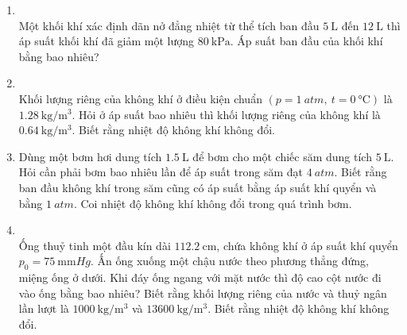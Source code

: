 \begin{enumerate}[label=\bfseries Câu \arabic*:, leftmargin=1.7cm]
\item{}\\
Một khối khí xác định dãn nở đẳng nhiệt từ thể tích ban đầu $\SI{5}{\liter}$ đến $\SI{12}{\liter}$ thì áp suất khối khí đã giảm một lượng $\SI{80}{\kilo\pascal}$. Áp suất ban đầu của khối khí bằng bao nhiêu?

\item {}\\
Khối lượng riêng của không khí ở điều kiện chuẩn $\left(p=\SI{1}{atm},\ t=\SI{0}{\celsius}\right)$ là $\SI{1.28}{\kilogram/\meter^3}$. Hỏi ở áp suất bao nhiêu thì khối lượng riêng của không khí là $\SI{0.64}{\kilogram/\meter^3}$. Biết rằng nhiệt độ không khí không đổi.

\item Dùng một bơm hơi dung tích $\SI{1.5}{\liter}$ để bơm cho một chiếc săm dung tích $\SI{5}{\liter}$. Hỏi cần phải bơm bao nhiêu lần để áp suất trong săm đạt $\SI{4}{atm}$. Biết rằng ban đầu không khí trong săm cũng có áp suất bằng áp suất khí quyển và bằng $\SI{1}{atm}$. Coi nhiệt độ không khí không đổi trong quá trình bơm.

\item {}\\
Ống thuỷ tinh một đầu kín dài $\SI{112.2}{\centi\meter}$, chứa không khí ở áp suất khí quyển $p_0=\SI{75}{\milli\meter Hg}$. Ấn ống xuống một chậu nước theo phương thẳng đứng, miệng ống ở dưới. Khi đáy ống ngang với mặt nước thì độ cao cột nước đi vào ống bằng bao nhiêu? Biết rằng khối lượng riêng của nước  và thuỷ ngân lần lượt là $\SI{1000}{\kilogram/\meter^3}$ và $\SI{13600}{\kilogram/\meter^3}$. Biết rằng nhiệt độ không khí không đổi.


\end{enumerate}
